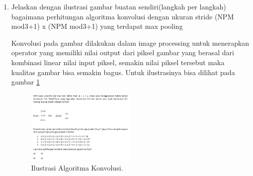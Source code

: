 \begin{enumerate}
\item Jelaskan dengan ilustrasi gambar buatan sendiri(langkah per langkah) bagaimana perhitungan algoritma konvolusi dengan ukuran stride (NPM mod3+1) x (NPM mod3+1) yang terdapat max pooling \par
Konvolusi pada gambar dilakukan dalam image processing untuk menerapkan operator yang memiliki nilai output dari piksel gambar yang berasal dari kombinasi linear nilai input piksel, semakin nilai piksel tersebut maka kualitas gambar bisa semakin bagus. Untuk ilustrasinya bisa dilihat pada gambar \ref{toke13}
		\begin{figure}[!htbp]
		\centerline{\includegraphics[width=0.5\textwidth]{figures/im/toke13.png}}
		\caption{Ilustrasi Algoritma Konvolusi.}
		\label{toke13}
		\end{figure}
\end{enumerate}

